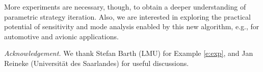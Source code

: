 \documentclass[a4paper]{easychair}
\begin{document}
More experiments are necessary, though, to obtain a deeper understanding of parametric strategy iteration.
Also, we are interested in exploring the practical potential of sensitivity and mode
analysis enabled by this new algorithm, e.g., for automotive and avionic
applications.



\smallskip

\noindent
\emph{Acknowledgement.}
We thank Stefan Barth (LMU) for Example \ref{e:exp}, and
Jan Reineke (Universit\"at des Saarlandes) for useful discussions.





\end{document}
